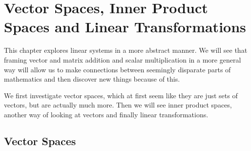 



\chapter{Vector Spaces, Inner Product Spaces and Linear Transformations}

This chapter explores linear systems in a more abstract manner.  We will see that framing vector and matrix addition and scalar multiplication in a more general way will allow us to make connections between seemingly disparate parts of mathematics and then discover new things because of this.  

We first investigate vector spaces, which at first seem like they are just sets of vectors, but are actually much more.  Then we will see inner product spaces, another way of looking at vectors and finally linear transformations. 

\section{Vector Spaces}  \label{sect:vector:space}



